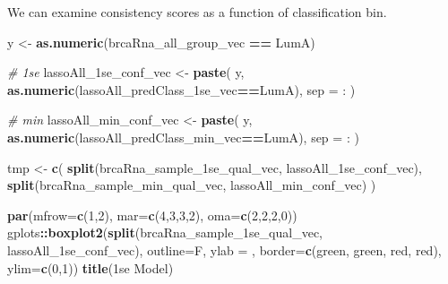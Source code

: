 \documentclass[
]{book}
\newenvironment{Shaded}{\begin{snugshade}}{\end{snugshade}}
\newcommand{\CommentTok}[1]{\textcolor[rgb]{0.56,0.35,0.01}{\textit{#1}}}
\newcommand{\DataTypeTok}[1]{\textcolor[rgb]{0.13,0.29,0.53}{#1}}
\newcommand{\DecValTok}[1]{\textcolor[rgb]{0.00,0.00,0.81}{#1}}
\newcommand{\KeywordTok}[1]{\textcolor[rgb]{0.13,0.29,0.53}{\textbf{#1}}}
\newcommand{\NormalTok}[1]{#1}
\newcommand{\OperatorTok}[1]{\textcolor[rgb]{0.81,0.36,0.00}{\textbf{#1}}}
\newcommand{\StringTok}[1]{\textcolor[rgb]{0.31,0.60,0.02}{#1}}
\begin{document}
We can examine consistency scores as a function of classification bin.

\begin{Shaded}
\begin{Highlighting}[]
\NormalTok{y <{-}}\StringTok{ }\KeywordTok{as.numeric}\NormalTok{(brcaRna\_all\_group\_vec }\OperatorTok{==}\StringTok{ \textquotesingle{}LumA\textquotesingle{}}\NormalTok{)}

\CommentTok{\# 1se}
\NormalTok{lassoAll\_1se\_conf\_vec <{-}}\StringTok{ }\KeywordTok{paste}\NormalTok{(}
\NormalTok{ y, }
 \KeywordTok{as.numeric}\NormalTok{(lassoAll\_predClass\_1se\_vec}\OperatorTok{==}\StringTok{\textquotesingle{}LumA\textquotesingle{}}\NormalTok{),}
 \DataTypeTok{sep =} \StringTok{\textquotesingle{}:\textquotesingle{}}
\NormalTok{)}

\CommentTok{\# min}
\NormalTok{lassoAll\_min\_conf\_vec <{-}}\StringTok{ }\KeywordTok{paste}\NormalTok{(}
\NormalTok{ y, }
 \KeywordTok{as.numeric}\NormalTok{(lassoAll\_predClass\_min\_vec}\OperatorTok{==}\StringTok{\textquotesingle{}LumA\textquotesingle{}}\NormalTok{),}
 \DataTypeTok{sep =} \StringTok{\textquotesingle{}:\textquotesingle{}}
\NormalTok{)}


\NormalTok{tmp <{-}}\StringTok{ }\KeywordTok{c}\NormalTok{(}
 \KeywordTok{split}\NormalTok{(brcaRna\_sample\_1se\_qual\_vec, lassoAll\_1se\_conf\_vec), }
 \KeywordTok{split}\NormalTok{(brcaRna\_sample\_min\_qual\_vec, lassoAll\_min\_conf\_vec)}
\NormalTok{)}

\KeywordTok{par}\NormalTok{(}\DataTypeTok{mfrow=}\KeywordTok{c}\NormalTok{(}\DecValTok{1}\NormalTok{,}\DecValTok{2}\NormalTok{), }\DataTypeTok{mar=}\KeywordTok{c}\NormalTok{(}\DecValTok{4}\NormalTok{,}\DecValTok{3}\NormalTok{,}\DecValTok{3}\NormalTok{,}\DecValTok{2}\NormalTok{), }\DataTypeTok{oma=}\KeywordTok{c}\NormalTok{(}\DecValTok{2}\NormalTok{,}\DecValTok{2}\NormalTok{,}\DecValTok{2}\NormalTok{,}\DecValTok{0}\NormalTok{))}
\NormalTok{gplots}\OperatorTok{::}\KeywordTok{boxplot2}\NormalTok{(}\KeywordTok{split}\NormalTok{(brcaRna\_sample\_1se\_qual\_vec, lassoAll\_1se\_conf\_vec), }
  \DataTypeTok{outline=}\NormalTok{F, }\DataTypeTok{ylab =} \StringTok{\textquotesingle{}\textquotesingle{}}\NormalTok{, }
  \DataTypeTok{border=}\KeywordTok{c}\NormalTok{(}\StringTok{\textquotesingle{}green\textquotesingle{}}\NormalTok{, }\StringTok{\textquotesingle{}green\textquotesingle{}}\NormalTok{, }\StringTok{\textquotesingle{}red\textquotesingle{}}\NormalTok{, }\StringTok{\textquotesingle{}red\textquotesingle{}}\NormalTok{),}
  \DataTypeTok{ylim=}\KeywordTok{c}\NormalTok{(}\DecValTok{0}\NormalTok{,}\DecValTok{1}\NormalTok{))}
\KeywordTok{title}\NormalTok{(}\StringTok{\textquotesingle{}1se Model\textquotesingle{}}\NormalTok{)}


\end{Highlighting}
\end{Shaded}
\end{document}
